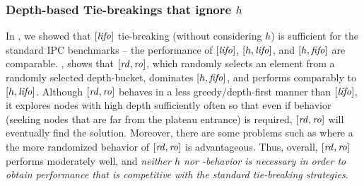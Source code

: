 

\subsubsection{Depth-based Tie-breakings that ignore $h$}

In , we showed that $[\mbox{\textit{lifo}}]$ tie-breaking (without considering $h$) is
sufficient for the standard IPC benchmarks -- the performance of $[\mbox{\textit{lifo}}]$, $[h,\mbox{\textit{lifo}}]$, and $[h,\mbox{\textit{fifo}}]$ are comparable.
, shows that $[\mbox{\textit{rd}},\mbox{\textit{ro}}]$, which randomly selects an element from a randomly selected depth-bucket, dominates $[h,\mbox{\textit{fifo}}]$,
and performs comparably to $[h,\mbox{\textit{lifo}}]$.
Although $[\mbox{\textit{rd}},\mbox{\textit{ro}}]$ behaves in a less greedy/depth-first manner than $[\mbox{\textit{lifo}}]$, 
it explores nodes with high depth sufficiently often so that even if \lifo behavior (seeking nodes that are far from the plateau entrance) is required, $[\mbox{\textit{rd}},\mbox{\textit{ro}}]$ will eventually find the solution.
Moreover, there are some problems such as  where a the more randomized behavior of $[\mbox{\textit{rd}},\mbox{\textit{ro}}]$ is advantageous.
Thus, overall, $[\mbox{\textit{rd}},\mbox{\textit{ro}}]$ performs moderately well, and 
\emph{neither $h$ nor \lifo-behavior is necessary in order to obtain performance that is competitive with the standard
tie-breaking strategies}.



